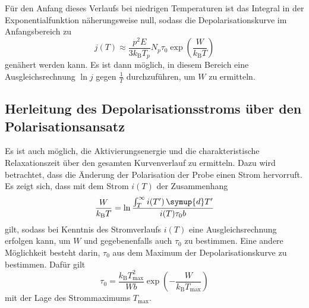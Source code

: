 Für den Anfang dieses Verlaufs bei niedrigen Temperaturen ist das Integral in der Exponentialfunktion näherungsweise null, sodass die Depolarisationskurve im Anfangsbereich zu
\begin{equation}
  j(T) \approx \frac{p^2 E}{3 k_\text{B} T_p} {N_p}{\tau_0}
               \exp\left(\frac{W}{k_{\text{B}}T}\right)
               \label{eqn:naeherung}
\end{equation}
genähert werden kann. Es ist dann möglich, in diesem Bereich eine Ausgleichsrechnung $\ln j$ gegen $\frac{1}{T}$ durchzuführen, um $W$ zu ermitteln.

\subsection{Herleitung des Depolarisationsstroms über den Polarisationsansatz}

Es ist auch möglich, die Aktivierungsenergie und die charakteristische Relaxationszeit über den gesamten Kurvenverlauf zu ermitteln. Dazu wird betrachtet, dass die Änderung der Polarisation der Probe einen Strom hervorruft.
Es zeigt sich, dass mit dem Strom $i(T)$ der Zusammenhang
\begin{equation}
  \frac{W}{k_\text{B}T} = \ln \frac{\int_T^\infty i(T')\,\symup{d}T'}{i(T) \tau_0 b}
\end{equation}
gilt, sodass bei Kenntnis des Stromverlaufs $i(T)$ eine Ausgleichsrechnung erfolgen kann, um $W$ und gegebenenfalls auch $\tau_0$ zu bestimmen.
Eine andere Möglichkeit besteht darin, $\tau_0$ aus dem Maximum der Depolarisationskurve zu bestimmen. Dafür gilt
\begin{equation}
  \tau_0 = \frac{k_\text{B}T_{\text{max}}^2}{Wb}\exp\left(-\frac{W}{k_\text{B}T_\text{max}}\right)
\end{equation}
mit der Lage des Strommaximums $T_\text{max}$.
